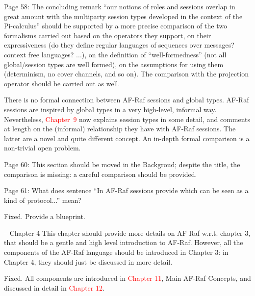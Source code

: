 \documentclass{article}
\newcommand*\R[1]{\textcolor{red}{#1}} %
\newcommand{\todo}[1]{[\textcolor{green}{TODO}: #1]}
\newenvironment{them}{\noindent\begingroup\color{blue}}{\endgroup\par}
\begin{document}
\begin{them}

Page 58:
The concluding remark “our notions of roles and sessions overlap in great
amount with the multiparty session types developed in the context of the
Pi-calculus” should be supported by a more precise comparison of the two
formalisms carried out based on the operators they support, on their
expressiveness (do they define regular languages of sequences over messages?
context free languages? ...), on the definition of “well-formedness” (not all
global/session types are well formed), on the assumptions for using them
(determinism, no cover channels, and so on). The comparison with the projection
operator should be carried out as well.

\end{them}

There is no formal connection between AF-Raf sessions and global types.
AF-Raf sessions are inspired by global types in a very high-level,
  informal way.
Nevertheless,
  \R{Chapter~9} now explains session types in some detail,
  and comments at length on the (informal) relationship they have with
    AF-Raf sessions.
The latter are a novel and quite different concept.
An in-depth formal comparison is a non-trivial open problem.


\begin{them}

Page 60:
This section should be moved in the Backgroud; despite the title, the
comparison is missing: a careful comparison should be provided.

\end{them}
\todo{}

\begin{them}

Page 61:
What does sentence “In AF-Raf sessions provide which can be seen as a kind of
protocol...” mean?

\end{them}
Fixed. Provide a blueprint.

\begin{them}

-- Chapter 4
This chapter should provide more details on AF-Raf w.r.t. chapter 3, that
should be a gentle and high level introduction to AF-Raf. However, all the
components of the AF-Raf language should be introduced in Chapter 3: in Chapter
4, they should just be discussed in more detail.

\end{them}
Fixed. All components are introduced in \R{Chapter 11}, Main AF-Raf Concepts, and discussed in detail in \R{Chapter 12}.
\end{document}
